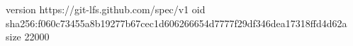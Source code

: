 version https://git-lfs.github.com/spec/v1
oid sha256:f060c73455a8b19277b67cec1d606266654d7777f29df346dea17318ffd4d62a
size 22000
